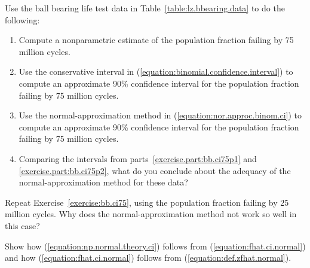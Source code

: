 \begin{exercise}
\label{exercise:bb.ci75}
Use the ball bearing life test data in
Table~\ref{table:lz.bbearing.data} to do the following:
\begin{enumerate}
\item
Compute a nonparametric estimate of the population fraction failing by
75 million cycles.
\item
\label{exercise.part:bb.ci75p1}
Use the conservative interval in
(\ref{equation:binomial.confidence.interval}) to compute an
approximate 90\% confidence interval for the population
fraction failing by 75 million cycles.
\item
\label{exercise.part:bb.ci75p2}
Use the normal-approximation method in
(\ref{equation:nor.approc.binom.ci}) to compute an approximate 90\%
confidence interval for the population
fraction failing by 75 million cycles.
\item
Comparing the intervals from parts~\ref{exercise.part:bb.ci75p1} and
\ref{exercise.part:bb.ci75p2}, what do you conclude about the adequacy of
the normal-approximation method for these data?
\end{enumerate}
\end{exercise}

\begin{exercise}
Repeat Exercise~\ref{exercise:bb.ci75}, using the population
fraction failing by 25 million cycles. 
Why does the normal-approximation method not work so
well in this case?
\end{exercise}

\begin{exercise}
Show how (\ref{equation:np.normal.theory.ci}) follows from
(\ref{equation:fhat.ci.normal}) and how (\ref{equation:fhat.ci.normal})
follows from (\ref{equation:def.zfhat.normal}).
\end{exercise}


